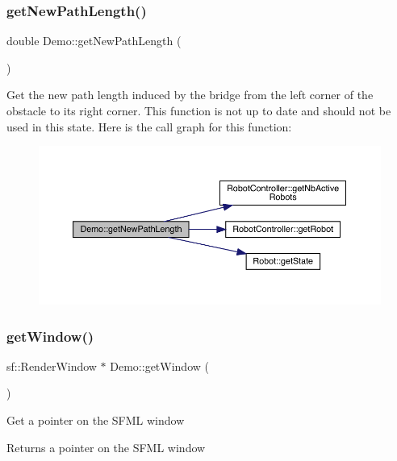\subsubsection{\texorpdfstring{get\+New\+Path\+Length()}{getNewPathLength()}}
{\footnotesize\ttfamily double Demo\+::get\+New\+Path\+Length (\begin{DoxyParamCaption}{ }\end{DoxyParamCaption})}

Get the new path length induced by the bridge from the left corner of the obstacle to its right corner. This function is not up to date and should not be used in this state. Here is the call graph for this function\+:\nopagebreak
\begin{figure}[H]
\begin{center}
\leavevmode
\includegraphics[width=350pt]{class_demo_acd4e28d1626c6979bbab2e396b717cba_cgraph}
\end{center}
\end{figure}
\mbox{\label{class_demo_a2b9c1e5275d36c3d82c0d4ee5d8a9741}} 
\subsubsection{\texorpdfstring{get\+Window()}{getWindow()}}
{\footnotesize\ttfamily sf\+::\+Render\+Window $\ast$ Demo\+::get\+Window (\begin{DoxyParamCaption}{ }\end{DoxyParamCaption})}

Get a pointer on the S\+F\+ML window \begin{DoxyReturn}{Returns}
a pointer on the S\+F\+ML window 
\end{DoxyReturn}
\mbox{\label{class_demo_a585ce54e47b0624ca078492d9aa1c59c}} 
